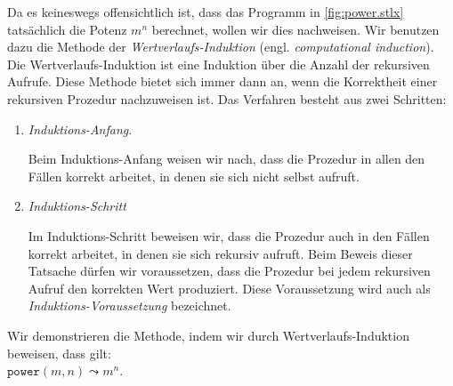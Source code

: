 Da es keineswegs offensichtlich ist, dass das Programm in \ref{fig:power.stlx} 
tats\"achlich die Potenz $m^n$ berechnet,  wollen wir dies nachweisen.  Wir benutzen dazu
die Methode der \emph{Wertverlaufs-Induktion} (engl. \emph{computational induction}).
Die Wertverlaufs-Induktion ist eine Induktion \"uber die Anzahl der rekursiven Aufrufe.
Diese Methode bietet sich immer dann an, wenn die Korrektheit einer rekursiven Prozedur
nachzuweisen ist. Das Verfahren besteht aus zwei Schritten:
\begin{enumerate}
\item \emph{Induktions-Anfang}.

      Beim Induktions-Anfang weisen wir nach, dass die Prozedur in allen den F\"allen korrekt arbeitet,
      in denen sie sich nicht selbst aufruft.  
\item \emph{Induktions-Schritt}

      Im Induktions-Schritt beweisen wir, dass die Prozedur auch in den F\"allen korrekt
      arbeitet, in denen sie sich rekursiv aufruft.   Beim Beweis dieser Tatsache d\"urfen
      wir voraussetzen, dass die Prozedur bei jedem rekursiven Aufruf den korrekten Wert
      produziert. Diese Voraussetzung wird auch als \emph{Induktions-Voraussetzung} bezeichnet.
\end{enumerate}
Wir demonstrieren die Methode, indem wir durch Wertverlaufs-Induktion beweisen, dass 
gilt: 
\\[0.1cm]
\hspace*{1.3cm} $\mathtt{power}(m,n) \leadsto m^n$.
